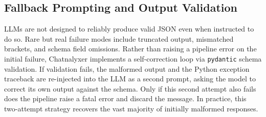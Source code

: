 \subsection{Fallback Prompting and Output Validation}
LLMs are not designed to reliably produce valid JSON even when instructed to do so. Rare but real failure modes include truncated output, mismatched brackets, and schema field omissions. Rather than raising a pipeline error on the initial failure, Chatnalyxer implements a self-correction loop via \texttt{pydantic} schema validation. If validation fails, the malformed output and the Python exception traceback are re-injected into the LLM as a second prompt, asking the model to correct its own output against the schema. Only if this second attempt also fails does the pipeline raise a fatal error and discard the message. In practice, this two-attempt strategy recovers the vast majority of initially malformed responses.
